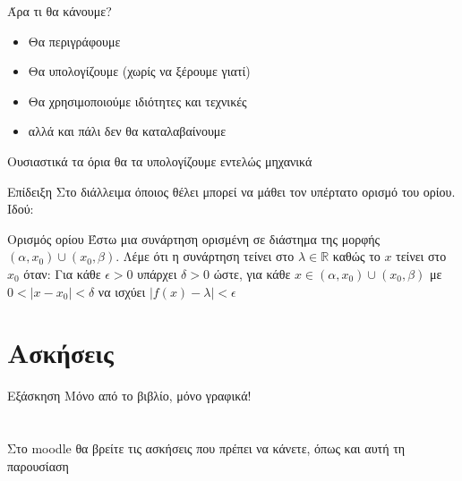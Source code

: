 \documentclass{presentation}
\begin{document}
\begin{frame}{Άρα τι θα κάνουμε?}
      \begin{itemize}
            \item Θα περιγράφουμε
                  \item<2->Θα υπολογίζουμε (χωρίς να ξέρουμε γιατί)
            \item<3-> Θα χρησιμοποιούμε ιδιότητες και τεχνικές
            \item<4-> αλλά και πάλι δεν θα καταλαβαίνουμε
      \end{itemize}
      Ουσιαστικά τα όρια θα τα υπολογίζουμε εντελώς μηχανικά
\end{frame}

\begin{frame}{Επίδειξη}
      Στο διάλλειμα όποιος θέλει μπορεί να μάθει τον υπέρτατο ορισμό του ορίου. Ιδού:
      \begin{block}{Ορισμός ορίου}
            Έστω μια συνάρτηση ορισμένη σε διάστημα της μορφής $(α,x_0)\cup (x_0,β)$. Λέμε ότι η συνάρτηση τείνει στο $λ\in\mathbb{R}$ καθώς το $x$ τείνει στο $x_0$ όταν:
            \newline
            \newline
            Για κάθε $\epsilon>0$ υπάρχει $δ>0$ ώστε, για κάθε $x\in (α,x_0)\cup (x_0,β)$ με $0<|x-x_0|<δ$ να ισχύει $|f(x)-λ|<\epsilon$
      \end{block}

\end{frame}

\section{Ασκήσεις}
\begin{frame}{Εξάσκηση}
      Μόνο από το βιβλίο, μόνο γραφικά!
\end{frame}

\section{}
\begin{frame}
      Στο moodle θα βρείτε τις ασκήσεις που πρέπει να κάνετε, όπως και αυτή τη παρουσίαση
\end{frame}
\end{document}
